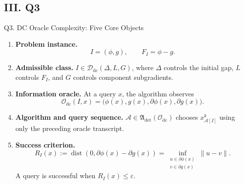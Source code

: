 \documentclass[10pt]{beamer}
\begin{document}
\subsection{III. Q3}
\begin{frame}{Q3. DC Oracle Complexity: Five Core Objects}
\footnotesize
\begin{enumerate}\setlength{\itemsep}{4pt}
    \item \textbf{Problem instance.}
    \[
        I=(\phi,g),\qquad F_I=\phi-g.
    \]

    \item \textbf{Admissible class.}
    $I\in\mathcal D_{\mathrm{dc}}(\Delta,L,G)$, where $\Delta$ controls the
    initial gap, $L$ controls $F_I$, and $G$ controls component subgradients.

    \item \textbf{Information oracle.}
    At a query $x$, the algorithm observes
    \[
        \mathcal O_{\mathrm{dc}}(I,x)
        =\bigl(\phi(x),g(x),\partial\phi(x),\partial g(x)\bigr).
    \]

    \item \textbf{Algorithm and query sequence.}
    $\mathcal A\in\mathfrak A_{\mathrm{det}}(\mathcal O_{\mathrm{dc}})$ chooses
    $x_{\mathcal A[I]}^k$ using only the preceding oracle transcript.

    \item \textbf{Success criterion.}
    \[
    R_I(x):=\operatorname{dist}\!\left(0,\partial\phi(x)-\partial g(x)\right)
    =\inf_{\substack{u\in\partial\phi(x)\\v\in\partial g(x)}}\|u-v\|.
    \]
    A query is successful when $R_I(x)\le\varepsilon$.
\end{enumerate}
\end{frame}
\end{document}
